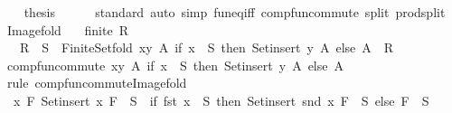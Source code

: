 \begin{isabellebody}
\ \ \isamarkupfalse%
\ {\isacharquery}{\kern0pt}thesis\isanewline
\ \ \ \ \isamarkupfalse%
\ standard\ {\isacharparenleft}{\kern0pt}auto\ simp{\isacharcolon}{\kern0pt}\ fun{\isacharunderscore}{\kern0pt}eq{\isacharunderscore}{\kern0pt}iff\ comp{\isacharunderscore}{\kern0pt}fun{\isacharunderscore}{\kern0pt}commute\ split{\isacharcolon}{\kern0pt}\ prod{\isachardot}{\kern0pt}split{\isacharparenright}{\kern0pt}\isanewline
{}\isamarkupfalse%
%
\endisatagproof
{\isafoldproof}%
%
\isadelimproof
\isanewline
%
\endisadelimproof
\isanewline
{}\isamarkupfalse%
\ Image{\isacharunderscore}{\kern0pt}fold{\isacharcolon}{\kern0pt}\isanewline
\ \ \ {\isachardoublequoteopen}finite\ R{\isachardoublequoteclose}\isanewline
\ \ \ {\isachardoublequoteopen}R\ {\isacharbackquote}{\kern0pt}{\isacharbackquote}{\kern0pt}\ S\ {\isacharequal}{\kern0pt}\ Finite{\isacharunderscore}{\kern0pt}Set{\isachardot}{\kern0pt}fold\ {\isacharparenleft}{\kern0pt}{\isasymlambda}{\isacharparenleft}{\kern0pt}x{\isacharcomma}{\kern0pt}y{\isacharparenright}{\kern0pt}\ A{\isachardot}{\kern0pt}\ if\ x\ {\isasymin}\ S\ then\ Set{\isachardot}{\kern0pt}insert\ y\ A\ else\ A{\isacharparenright}{\kern0pt}\ {\isacharbraceleft}{\kern0pt}{\isacharbraceright}{\kern0pt}\ R{\isachardoublequoteclose}\isanewline
%
\isadelimproof
%
\endisadelimproof
%
\isatagproof
{}\isamarkupfalse%
\ {\isacharminus}{\kern0pt}\isanewline
\ \ \isamarkupfalse%
\ comp{\isacharunderscore}{\kern0pt}fun{\isacharunderscore}{\kern0pt}commute\ {\isachardoublequoteopen}{\isacharparenleft}{\kern0pt}{\isasymlambda}{\isacharparenleft}{\kern0pt}x{\isacharcomma}{\kern0pt}y{\isacharparenright}{\kern0pt}\ A{\isachardot}{\kern0pt}\ if\ x\ {\isasymin}\ S\ then\ Set{\isachardot}{\kern0pt}insert\ y\ A\ else\ A{\isacharparenright}{\kern0pt}{\isachardoublequoteclose}\isanewline
\ \ \ \ \isamarkupfalse%
\ {\isacharparenleft}{\kern0pt}rule\ comp{\isacharunderscore}{\kern0pt}fun{\isacharunderscore}{\kern0pt}commute{\isacharunderscore}{\kern0pt}Image{\isacharunderscore}{\kern0pt}fold{\isacharparenright}{\kern0pt}\isanewline
\ \ \isamarkupfalse%
\ {\isacharasterisk}{\kern0pt}{\isacharcolon}{\kern0pt}\ {\isachardoublequoteopen}{\isasymAnd}x\ F{\isachardot}{\kern0pt}\ Set{\isachardot}{\kern0pt}insert\ x\ F\ {\isacharbackquote}{\kern0pt}{\isacharbackquote}{\kern0pt}\ S\ {\isacharequal}{\kern0pt}\ {\isacharparenleft}{\kern0pt}if\ fst\ x\ {\isasymin}\ S\ then\ Set{\isachardot}{\kern0pt}insert\ {\isacharparenleft}{\kern0pt}snd\ x{\isacharparenright}{\kern0pt}\ {\isacharparenleft}{\kern0pt}F\ {\isacharbackquote}{\kern0pt}{\isacharbackquote}{\kern0pt}\ S{\isacharparenright}{\kern0pt}\ else\ {\isacharparenleft}{\kern0pt}F\ {\isacharbackquote}{\kern0pt}{\isacharbackquote}{\kern0pt}\ S{\isacharparenright}{\kern0pt}{\isacharparenright}{\kern0pt}{\isachardoublequoteclose}\isanewline

\end{isabellebody}
